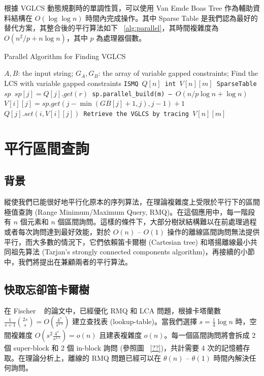\documentclass{gapd}
\begin{document}
根據 VGLCS 動態規劃時的單調性質，可以使用 Van Emde Boas Tree 作為輔助資料結構在 $O(\log \log n)$ 時間內完成操作。其中 Sparse Table 是我們認為最好的替代方案，其整合後的平行算法如下 ~\ref{alg:parallel}，其時間複雜度為 $O(n^2 / p + n \log n)$，其中 $p$ 為處理器個數。

\begin{algorithm*}
  \caption{Parallel Algorithm for Finding VGLCS}
  \label{alg:parallel}
  \begin{algorithmic}[1]
    \Require
      $A, B$: the input string;
      $G_A, G_B$: the array of variable gapped constraints;
    \Ensure Find the LCS with variable gapped constraints
    \State \tt{ISMQ} $Q[n]$
    \State \tt{int} $V[n][m]$
      \State SparseTable $sp$
        \State $sp[j] = Q[j].get(r)$
      \EndParFor
      \State sp.parallel\_build(m) -- $O(n/p \log n + \log n)$
            \State $V[i][j] = sp.get(j - \min(GB[j]+1, j), j-1)+1$
            \State $Q[j].set(i, V[i][j])$
        \EndIf
      \EndParFor
    \EndFor
    \State Retrieve the VGLCS by tracing $V[n][m]$
  \end{algorithmic}
\end{algorithm*}

\section{平行區間查詢} %
\label{sec:parallelRMQ}

\subsection{背景}

縱使我們已能很好地平行化原本的序列算法，在理論複雜度上受限於平行下的區間極值查詢 (Range Minimum/Maximum Query, RMQ)。在這個應用中，每一階段有 $n$ 個元素和 $n$ 個區間詢問。這樣的條件下，大部分樹狀結構難以在前處理過程或者每次詢問達到最好效能，對於 $O(n)$ -- $O(1)$ 操作的離線區間詢問無法提供平行，而大多數的情況下，它們依賴笛卡爾樹 (Cartesian tree) 和塔揚離線最小共同祖先算法 (Tarjan's strongly connected components algorithm)，再接續的小節中，我們將提出在兼顧兩者的平行算法。

\subsection{快取忘卻笛卡爾樹}

在 Fischer ~\cite{fischer} 的論文中，已經優化 RMQ 和 LCA 問題，根據卡塔蘭數 $\frac{1}{s+1}\binom{2s}{s} = O(\frac{4^s}{s^{1.5}})$ 建立查找表 (lookup-table)。當我們選擇 $s = \frac{1}{4} \log n$ 時，空間複雜度 $O(s^2 \frac{4^s}{s^{1.5}}) = o(n)$ 且建表複雜度 $o(n)$。每一個區間詢問將會拆成 2 個 super-block 和 2 個 in-block 詢問 (參照圖 ~\ref{??})，共計需要 4 次的記憶體存取。在理論分析上，離線的 RMQ 問題已經可以在 $\theta(n)$ -- $\theta(1)$ 時間內解決任何詢問。
\end{document}
